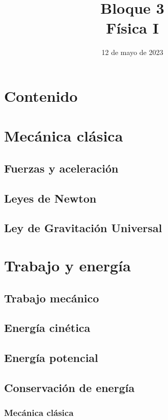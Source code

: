 \documentclass[14pt]{beamer}
\title{\Large{Bloque 3} \\ \normalsize{Física I}}
\date{12 de mayo de 2023}
\begin{document}
\maketitle

\section*{Contenido}

\section{Mecánica clásica}
\subsection{Fuerzas y aceleración}

\subsection{Leyes de Newton}

\subsection{Ley de Gravitación Universal}

\section{Trabajo y energía}
\subsection{Trabajo mecánico}

\subsection{Energía cinética}

\subsection{Energía potencial}

\subsection{Conservación de energía}


\begin{frame}
\frametitle{Mecánica clásica}

\end{frame}
\end{document}
